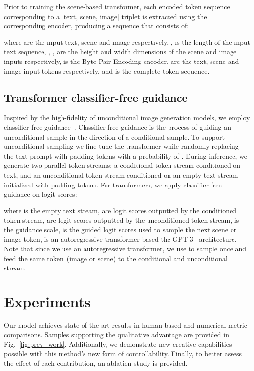 \documentclass[final]{cvpr}
\begin{document}
Prior to training the scene-based transformer, each encoded token sequence corresponding to a [text, scene, image] triplet is extracted using the corresponding encoder, producing a sequence that consists of:

where  are the input text, scene and image respectively, ,  is the length of the input text sequence, , ,  are the height and width dimensions of the scene and image inputs respectively,  is the Byte Pair Encoding encoder,  are the text, scene and image input tokens respectively, and  is the complete token sequence.

\subsection{Transformer classifier-free guidance}
Inspired by the high-fidelity of unconditional image generation models, we employ classifier-free guidance~\cite{transformerCF,ho2021classifier,radford2021learning}. Classifier-free guidance is the process of guiding an unconditional sample in the direction of a conditional sample. To support unconditional sampling we fine-tune the transformer while randomly replacing the text prompt with padding tokens with a probability of . During inference, we generate two parallel token streams: a conditional token stream conditioned on text, and an unconditional token stream conditioned on an empty text stream initialized with padding tokens. For transformers, we apply classifier-free guidance on logit scores:

where  is the empty text stream,  are logit scores outputted by the conditioned token stream,  are logit scores outputted by the unconditioned token stream,  is the guidance scale,  is the guided logit scores used to sample the next scene or image token,  is an autoregressive transformer based the GPT-3~\cite{brown2020language} architecture. Note that since we use an autoregressive transformer, we use  to sample once and feed the same token~(image or scene) to the conditional and unconditional stream.

\section{Experiments}
Our model achieves state-of-the-art results in human-based and numerical metric comparisons. Samples supporting the qualitative advantage are provided in Fig.~\ref{fig:prev_work}. Additionally, we demonstrate new creative capabilities possible with this method's new form of controllability. Finally, to better assess the effect of each contribution, an ablation study is provided. 
\end{document}
